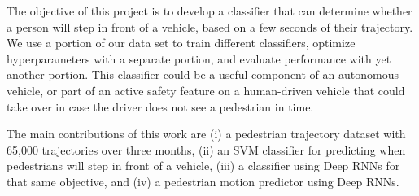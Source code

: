 
The objective of this project is to develop a classifier that can determine whether a person will step in front of a vehicle, based on a few seconds of their trajectory.
We use a portion of our data set to train different classifiers, optimize hyperparameters with a separate portion, and evaluate performance with yet another portion.
This classifier could be a useful component of an autonomous vehicle, or part of an active safety feature on a human-driven vehicle that could take over in case the driver does not see a pedestrian in time.

The main contributions of this work are 
(i) a pedestrian trajectory dataset with 65,000 trajectories over three months, (ii) an SVM classifier for predicting when pedestrians will step in front of a vehicle, (iii) a classifier using Deep RNNs for that same objective, and (iv) a pedestrian motion predictor using Deep RNNs.











